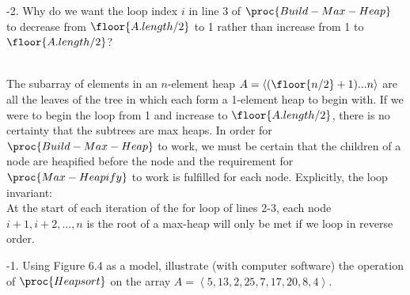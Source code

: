 \documentclass[addpoints,11pt]{exam}
\begin{document}
\begin{questions}
\ifprintanswers
\newpage
\else
\bigskip
\fi


%
%
-2.  Why do we want the loop index $i$ in line 3 of $\proc{Build-Max-Heap}$ to decrease from $\floor{A.length/2}$ to 1 rather than increase from 1 to $\floor{A.length/2}$?

\begin{solutionorbox} \\
	The subarray of elements in an $n$-element heap $A = \left< (\floor{n/2} + 1) ... n \right>$ are all the leaves of the tree in which each form a 1-element heap to begin with. If we were to begin the loop from 1 and increase to $\floor{A.length/2}$, there is no certainty that the subtrees are max heaps. In order for $\proc{Build-Max-Heap}$ to work, we must be certain that the children of a node are heapified before the node and the requirement for $\proc{Max-Heapify}$ to work is fulfilled for each node. Explicitly, the loop invariant: \\
	At the start of each iteration of the for loop of lines 2-3, each node $i + 1, i + 2, ..., n$ is the root of a max-heap will only be met if we loop in reverse order.
\end{solutionorbox}

\ifprintanswers
\newpage
\else
\bigskip
\fi


%
%
-1.  Using Figure 6.4 as a model, illustrate (with computer software) the operation of $\proc{Heapsort}$ on the array $A = \left< 5, 13, 2, 25, 7, 17, 20, 8, 4 \right>$.


\end{questions}
\end{document}
